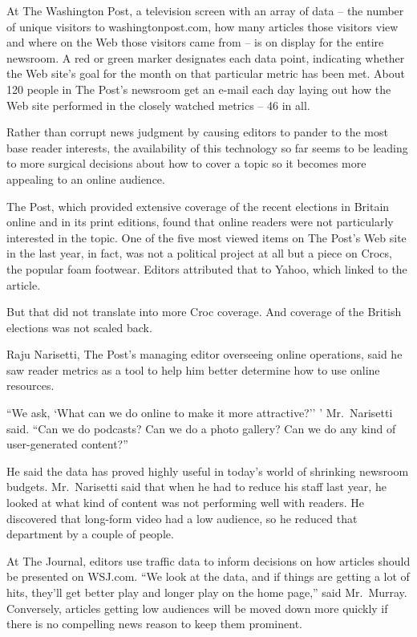 ﻿\documentclass[12pt]{article}
\begin{document}
At The Washington Post, a television screen with an array of data -- the number of unique visitors
to washingtonpost.com, how many articles those visitors view and where on the Web those visitors
came from -- is on display for the entire newsroom. A red or green marker designates each data
point, indicating whether the Web site's goal for the month on that particular metric has been met.
About 120 people in The Post's newsroom get an e-mail each day laying out how the Web site performed
in the closely watched metrics -- 46 in all.

Rather than corrupt news judgment by causing editors to pander to the most base reader interests,
the availability of this technology so far seems to be leading to more surgical decisions about how
to cover a topic so it becomes more appealing to an online audience.

The Post, which provided extensive coverage of the recent elections in Britain online and in its
print editions, found that online readers were not particularly interested in the topic. One of the
five most viewed items on The Post's Web site in the last year, in fact, was not a political project
at all but a piece on Crocs, the popular foam footwear. Editors attributed that to Yahoo, which
linked to the article.

But that did not translate into more Croc coverage. And coverage of the British elections was not
scaled back.

Raju Narisetti, The Post's managing editor overseeing online operations, said he saw reader metrics
as a tool to help him better determine how to use online resources.

``We ask, `What can we do online to make it more attractive?'' ' Mr.~Narisetti said. ``Can we do
podcasts? Can we do a photo gallery? Can we do any kind of user-generated content?''

He said the data has proved highly useful in today's world of shrinking newsroom budgets.
Mr.~Narisetti said that when he had to reduce his staff last year, he looked at what kind of content
was not performing well with readers. He discovered that long-form video had a low audience, so he
reduced that department by a couple of people.

At The Journal, editors use traffic data to inform decisions on how articles should be presented on
WSJ.com. ``We look at the data, and if things are getting a lot of hits, they'll get better play and
longer play on the home page,'' said Mr.~Murray. Conversely, articles getting low audiences will be
moved down more quickly if there is no compelling news reason to keep them prominent.
\end{document}

